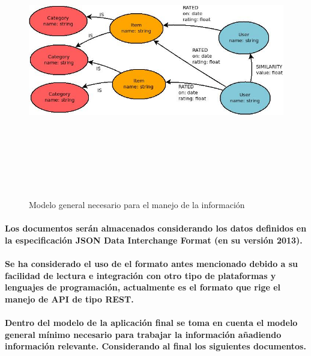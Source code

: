 \newpage
    \begin{landscape}
      \begin{figure}[h!]
      \centering
      \includegraphics[width=22.5cm,height=12cm]{./images/Diagrama_general_datos.jpg}
      \caption{Modelo general necesario para el manejo de la información}
    \end{figure}
    \end{landscape}
  \newpage

\paragraph{Los documentos serán almacenados considerando los datos definidos en la especificación JSON Data Interchange Format (en su versión 2013). \cite{16}}

\paragraph{Se ha considerado el uso de el formato antes mencionado debido a su facilidad de lectura e integración con otro tipo de plataformas y lenguajes de programación, actualmente es el formato que rige el manejo de API de tipo REST.}

\paragraph{Dentro del modelo de la aplicación final se toma en cuenta el modelo general mínimo necesario para trabajar la información añadiendo información relevante. Considerando al final los siguientes documentos.}

